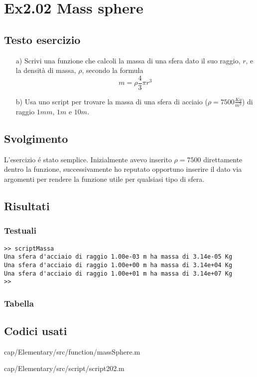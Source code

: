 \section{Ex2.02 Mass sphere}\label{sec:Mass_sphere}

\subsection{Testo esercizio}
\begin{itemize}
    \item[a)] Scrivi una funzione che calcoli la massa di una sfera 
    dato il suo raggio, $r$, e la densità di massa, $\rho$, secondo la 
    formula $$m=\rho\frac{4}{3}\pi r^3$$
    
    \item[b)] Usa uno script per trovare la massa di una sfera di 
    acciaio ($\rho=7500\frac{Kg}{m^3}$) di raggio $1mm$, $1m$ e $10m$.
\end{itemize}

\subsection{Svolgimento}
L'esercizio \'e stato semplice. Inizialmente avevo inserito $\rho=7500$ 
direttamente dentro la funzione, successivamente ho reputato opportuno 
inserire il dato via argomenti per rendere la funzione utile per 
qualsiasi tipo di sfera.

\subsection{Risultati}
\subsubsection{Testuali}
\color{gray}
\begin{verbatim}
>> scriptMassa
Una sfera d'acciaio di raggio 1.00e-03 m ha massa di 3.14e-05 Kg
Una sfera d'acciaio di raggio 1.00e+00 m ha massa di 3.14e+04 Kg
Una sfera d'acciaio di raggio 1.00e+01 m ha massa di 3.14e+07 Kg
>> 
\end{verbatim}
\color{black} 

\subsubsection{Tabella}    

\newpage

\subsection{Codici usati}

{cap/Elementary/src/function/massSphere.m}


{cap/Elementary/src/script/script202.m}